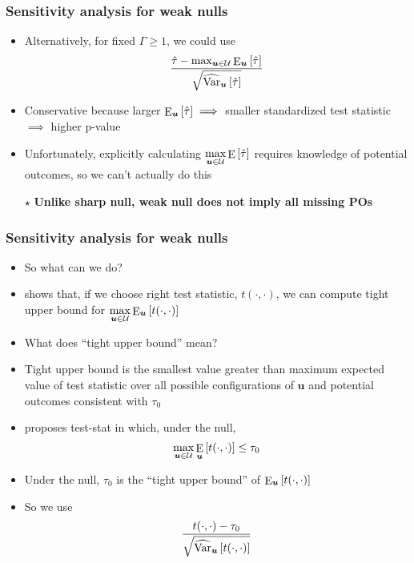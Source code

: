 \documentclass[table, xcolor = {dvipsnames}, 9pt]{beamer}
\theoremstyle{plain}
\DeclareMathOperator{\E}{\rm{E}}
\DeclareMathOperator{\Var}{\rm{Var}}
\begin{document}
\begin{frame}[t]
\frametitle{Sensitivity analysis for weak nulls} 
\vfill
\begin{itemize} \vfill
\item Alternatively, for fixed $\Gamma \geq 1$, we could use
\begin{equation}
\dfrac{\hat{\tau} - \max_{\bm{u} \in \mathcal{U}} \E_{\bm{u}}\left[\hat{\tau}\right]}{\sqrt{\widehat{\Var}_{\bm{u}}\left[\hat{\tau}\right]}}
\end{equation} \vfill
\item Conservative because larger $\E_{\bm{u}}\left[\hat{\tau}\right] \implies $ smaller standardized test statistic $\implies$ higher p-value \vfill
\item Unfortunately, explicitly calculating $\max \limits_{\bm{u} \in \mathcal{U}} \E\left[\hat{\tau}\right]$ requires knowledge of potential outcomes, so we can't actually do this \vfill
\item[$\star$] \textbf{Unlike sharp null, weak null does not imply all missing POs} \vfill
\end{itemize}  
\vfill
\end{frame}
\begin{frame}[t]
\frametitle{Sensitivity analysis for weak nulls} 
\vfill
\begin{itemize} \vfill
\item So what can we do? \vfill
\item \citet{fogarty2020} shows that, if we choose right test statistic, $t(\cdot, \cdot)$, we can compute tight upper bound for $\max \limits_{\bm{u} \in \mathcal{U}} \E_{\bm{u}}\left[t(\cdot, \cdot)\right]$ \vfill
\item What does ``tight upper bound'' mean? \vfill
\item Tight upper bound is the smallest value greater than maximum expected value of test statistic over all possible configurations of $\bm{u}$ and potential outcomes consistent with $\tau_0$ \vfill
\item \citet{fogarty2020} proposes test-stat in which, under the null,
\begin{equation*}
\max \limits_{\bm{u} \in \mathcal{U}} \E_{\bm{u}}\left[t(\cdot, \cdot)\right] \leq \tau_0
\end{equation*} \vfill
\item Under the null, $\tau_0$ is the ``tight upper bound'' of $\E_{\bm{u}}\left[t(\cdot, \cdot)\right]$ \vfill
\item So we use
\begin{equation}
\dfrac{t(\cdot, \cdot) - \tau_0}{\sqrt{\widehat{\Var}_{\bm{u}}\left[t(\cdot, \cdot)\right]}}
\end{equation}
\end{itemize}  
\vfill
\end{frame}
\end{document}
